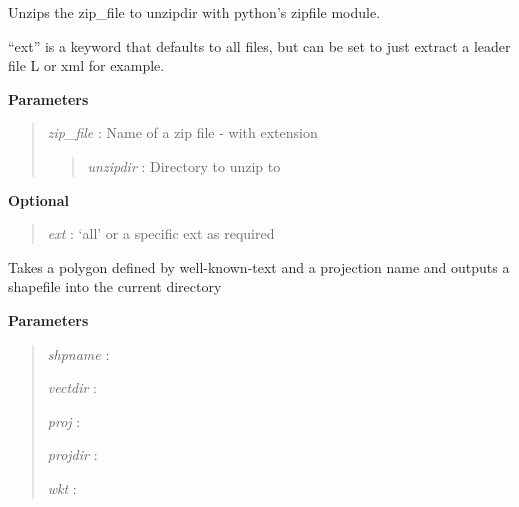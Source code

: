 \documentclass[letterpaper,10pt,openany,oneside]{sphinxmanual}
\begin{document}
\begin{fulllineitems}
\label{code:Util.unZip}
Unzips the zip\_file to unzipdir with python's zipfile module.

``ext'' is a keyword that defaults to all files, but can be set
to just extract a leader file L or xml for example.

\textbf{Parameters}
\begin{quote}

\emph{zip\_file} : Name of a zip file - with extension
\begin{quote}

\emph{unzipdir} : Directory to unzip to
\end{quote}
\end{quote}

\textbf{Optional}
\begin{quote}

\emph{ext}      : `all' or a specific ext as required
\end{quote}

\end{fulllineitems}


\begin{fulllineitems}
\label{code:Util.wkt2shp}
Takes a polygon defined by well-known-text and a projection name and outputs
a shapefile into the current directory

\textbf{Parameters}
\begin{quote}

\emph{shpname} :

\emph{vectdir} :

\emph{proj}    :

\emph{projdir} :

\emph{wkt}     :
\end{quote}

\end{fulllineitems}

\end{document}
